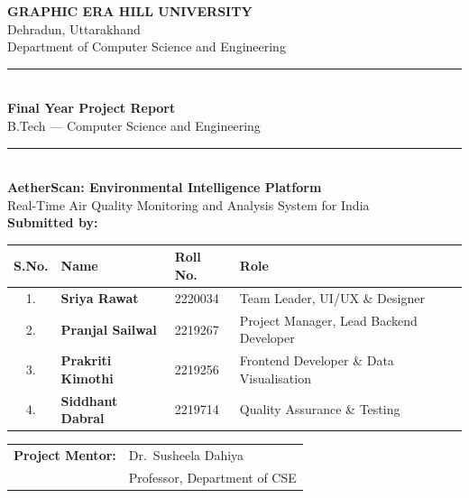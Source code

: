 \documentclass[12pt,a4paper]{article}
\begin{document}
\hfuzz=2pt


\begin{titlepage}
\centering
\vspace*{0.4cm}

{\Large\textbf{GRAPHIC ERA HILL UNIVERSITY}}\\[0.25cm]
{\large Dehradun, Uttarakhand}\\[0.2cm]
{\large Department of Computer Science and Engineering}\\[1.2cm]

\rule{\textwidth}{1.5pt}\\[0.4cm]
{\LARGE\textbf{Final Year Project Report}}\\[0.3cm]
{\large B.Tech --- Computer Science and Engineering}\\[0.3cm]
\rule{\textwidth}{1.5pt}\\[0.8cm]

{\LARGE\textbf{AetherScan: Environmental Intelligence Platform}}\\[0.3cm]
{\large Real-Time Air Quality Monitoring and Analysis System for India}\\[1.2cm]

\textbf{Submitted by:}\\[0.5cm]
\begin{tabular}{clll}
\toprule
\textbf{S.No.} & \textbf{Name} & \textbf{Roll No.} & \textbf{Role}\\
\midrule
1. & \textbf{Sriya Rawat}      & 2220034 & Team Leader, UI/UX \& Designer\\[0.15cm]
2. & \textbf{Pranjal Sailwal}  & 2219267 & Project Manager, Lead Backend Developer\\[0.15cm]
3. & \textbf{Prakriti Kimothi} & 2219256 & Frontend Developer \& Data Visualisation\\[0.15cm]
4. & \textbf{Siddhant Dabral}  & 2219714 & Quality Assurance \& Testing\\
\bottomrule
\end{tabular}

\vfill

\begin{tabular}{ll}
\textbf{Project Mentor:} & Dr.\ Susheela Dahiya\\
                         & Professor, Department of CSE\\
\end{tabular}\\[2.5cm]


\end{titlepage}
\end{document}

